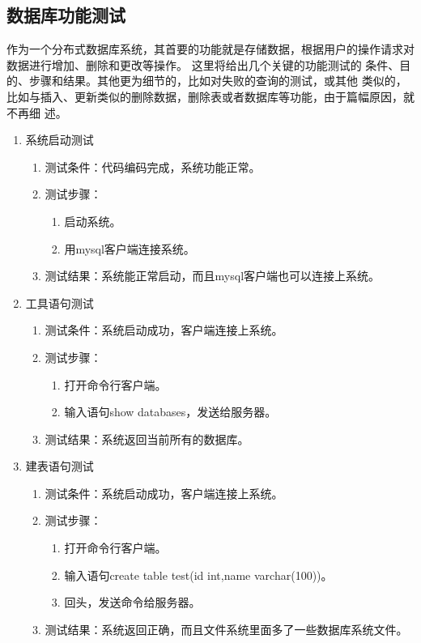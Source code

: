 \subsection{数据库功能测试}
作为一个分布式数据库系统，其首要的功能就是存储数据，根据用户的操作请求对数据进行增加、删除和更改等操作。
这里将给出几个关键的功能测试的
条件、目的、步骤和结果。其他更为细节的，比如对失败的查询的测试，或其他
类似的，比如与插入、更新类似的删除数据，删除表或者数据库等功能，由于篇幅原因，就不再细
述。
\begin{enumerate}

	\item 系统启动测试
	\begin{enumerate}
		\item 测试条件：代码编码完成，系统功能正常。
		\item 测试步骤：
		\begin{enumerate}
			\item 启动系统。
			\item 用mysql客户端连接系统。
		\end{enumerate}
	\item 	测试结果：系统能正常启动，而且mysql客户端也可以连接上系统。
	\end{enumerate}



\item 工具语句测试
\begin{enumerate}
	\item 测试条件：系统启动成功，客户端连接上系统。
	\item 测试步骤：
	\begin{enumerate}
		\item 打开命令行客户端。
		\item 输入语句show databases，发送给服务器。
	\end{enumerate}
	\item 	测试结果：系统返回当前所有的数据库。
\end{enumerate}	


\item 建表语句测试
\begin{enumerate}
	\item 测试条件：系统启动成功，客户端连接上系统。
	\item 测试步骤：
	\begin{enumerate}
		\item 打开命令行客户端。
		\item 输入语句create table test(id int,name	varchar(100))。
		\item 回头，发送命令给服务器。
	\end{enumerate}
	\item 	测试结果：系统返回正确，而且文件系统里面多了一些数据库系统文件。
\end{enumerate}	



\end{enumerate}
